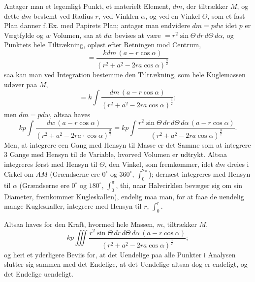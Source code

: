 \documentclass[12pt]{book}
\newcommand{\opage}[1]{\marginnote{\footnotesize\textit{[#1]}}}
\begin{document}
Antager man et legemligt Punkt, et materielt Element, $dm$, der
tiltrækker $M$, og dette $dm$ bestemt ved Radius $r$, ved Vinklen
$\alpha$, og ved en Vinkel $\Theta$, som et fast Plan danner f.\,Ex.
med Papirets Plan; antager man endvidere $dm = pdw$ idet $p$ er
Vægtfylde og $w$ Volumen, saa at $dw$ bevises at være
$= r^{2}\sin\Theta\,dr\,d\Theta\,d\alpha$, og Punktets hele
Tiltrækning, opløst efter Retningen mod Centrum,
\[
= \frac{kdm\,(a - r\cos\alpha)}{(r^{2} + a^{2} - 2ra\cos\alpha)^{\frac{3}{2}}}
\]
saa kan man ved Integration bestemme den Tiltrækning, som hele
Kuglemassen udøver paa $M$,
\[
= k\int \frac{dm\,(a - r\cos\alpha)}
  {(r^{2} + a^{2} - 2ra\cos\alpha)^{\frac{3}{2}}};
\]
men $dm = pdw$, altsaa haves
\[
kp\int \frac{dw\,(a - r\cos\alpha)}
  {(r^{2} + a^{2} - 2ra\cdot\cos\alpha)^{\frac{3}{2}}}
= kp\int \frac{r^{2}\sin\Theta\,dr\,d\Theta\,d\alpha\,(a - r\cos\alpha)}
  {(r^{2} + a^{2} - 2ra\cos\alpha)^{\frac{3}{2}}}.
\]
Men, at integrere een Gang med Hensyn til Masse er det Samme som at
integrere 3 Gange med Hensyn til de Variable, hvorved Volumen er
udtrykt. Altsaa integreres først med Hensyn til $\Theta$, den Vinkel,
som fremkommer, idet
\opage{84} $dm$ dreies i Cirkel om $AM$ (Grændserne ere $0^{\circ}$ og
$360^{\circ}$, $\int_{0}^{2\pi}$); dernæst integreres med Hensyn til
$\alpha$ (Grændserne ere $0^{\circ}$ og $180^{\circ}$,
$\int_{0}^{\pi}$, thi, naar Halvcirklen bevæger sig om sin Diameter,
fremkommer Kugleskallen), endelig maa man, for at faae de uendelig
mange Kugleskaller, integrere med Hensyn til $r$, $\int_{0}^{r}$.

Altsaa haves for den Kraft, hvormed hele Massen, $m$, tiltrækker $M$,
\[
kp\iiint \frac{r^{2}\sin\Theta\,dr\,d\Theta\,d\alpha\,(a - r\cos\alpha)}
  {(r^{2} + a^{2} - 2ra\cos\alpha)^{\frac{3}{2}}};
\]
og heri et yderligere Beviis for, at det Uendelige paa alle Punkter i
Analysen slutter sig sammen med det Endelige, at det Uendelige altsaa
dog er endeligt, og det Endelige uendeligt.
\end{document}
